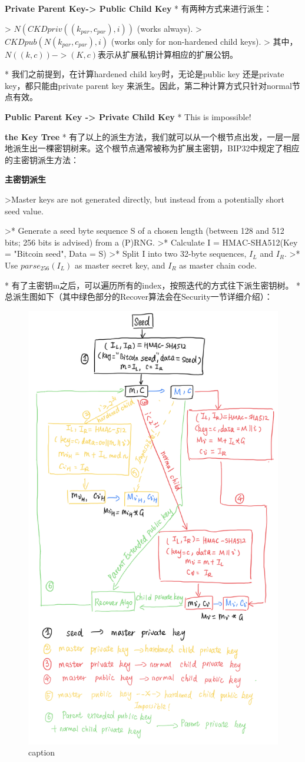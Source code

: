 \textbf{Private Parent Key-> Public Child Key}
* 有两种方式来进行派生：

> $N(CKDpriv((k_{par}, c_{par}), i))$ (works always).  
> $CKDpub(N(k_{par}, c_{par}), i)$ (works only for non-hardened child keys).  
> 其中，$N((k, c)) -> (K, c)$表示从扩展私钥计算相应的扩展公钥。

* 我们之前提到，在计算hardened child key时，无论是public key 还是private key，都只能由private parent key 来派生。因此，第二种计算方式只针对normal节点有效。

\textbf{Public Parent Key -> Private Child Key}
* This is impossible!

\textbf{the Key Tree}
* 有了以上的派生方法，我们就可以从一个根节点出发，一层一层地派生出一棵密钥树来。这个根节点通常被称为扩展主密钥，BIP32中规定了相应的主密钥派生方法：

\textbf{主密钥派生}

>Master keys are not generated directly, but instead from a potentially short seed value.

>* Generate a seed byte sequence S of a chosen length (between 128 and 512 bits; 256 bits is advised) from a (P)RNG.
>* Calculate I = HMAC-SHA512(Key = "Bitcoin seed", Data = S)
>* Split I into two 32-byte sequences, $I_L$ and $I_R$.
>* Use $parse_{256}(I_L)$ as master secret key, and $I_R$ as master chain code.
 
* 有了主密钥m之后，可以遍历所有的index，按照迭代的方式往下派生密钥树。
* 总派生图如下（其中绿色部分的Recover算法会在Security一节详细介绍）：

\begin{figure}[h]
\centering
\includegraphics[width=.7\textwidth]{./outline.png}
\caption{caption}\label{fig-parsesig}
\end{figure}

